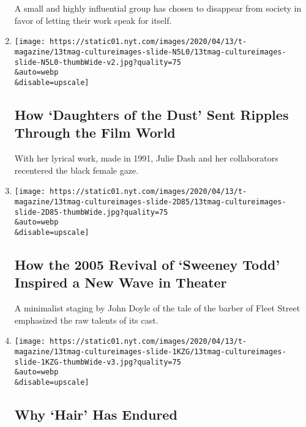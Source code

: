 \begin{enumerate}
  A small and highly influential group has chosen to disappear from
  society in favor of letting their work speak for itself.
\item
  \href{/interactive/2020/04/13/t-magazine/daughters-of-the-dust.html}{}

  \texttt{[image: https://static01.nyt.com/images/2020/04/13/t-magazine/13tmag-cultureimages-slide-N5L0/13tmag-cultureimages-slide-N5L0-thumbWide-v2.jpg?quality=75\\\&auto=webp\\\&disable=upscale]}

  \hypertarget{how-daughters-of-the-dust-sent-ripples-through-the-film-world}{%
  \subsection{How `Daughters of the Dust' Sent Ripples Through the Film
  World}\label{how-daughters-of-the-dust-sent-ripples-through-the-film-world}}

  With her lyrical work, made in 1991, Julie Dash and her collaborators
  recentered the black female gaze.
\item
  \href{/interactive/2020/04/13/t-magazine/sweeney-todd-revival.html}{}

  \texttt{[image: https://static01.nyt.com/images/2020/04/13/t-magazine/13tmag-cultureimages-slide-2D85/13tmag-cultureimages-slide-2D85-thumbWide.jpg?quality=75\\\&auto=webp\\\&disable=upscale]}

  \hypertarget{how-the-2005-revival-of-sweeney-todd-inspired-a-new-wave-in-theater}{%
  \subsection{How the 2005 Revival of `Sweeney Todd' Inspired a New Wave
  in
  Theater}\label{how-the-2005-revival-of-sweeney-todd-inspired-a-new-wave-in-theater}}

  A minimalist staging by John Doyle of the tale of the barber of Fleet
  Street emphasized the raw talents of its cast.
\item
  \href{/interactive/2020/04/13/t-magazine/hair-musical-broadway.html}{}

  \texttt{[image: https://static01.nyt.com/images/2020/04/13/t-magazine/13tmag-cultureimages-slide-1KZG/13tmag-cultureimages-slide-1KZG-thumbWide-v3.jpg?quality=75\\\&auto=webp\\\&disable=upscale]}

  \hypertarget{why-hair-has-endured}{%
  \subsection{Why `Hair' Has Endured}\label{why-hair-has-endured}}


\end{enumerate}
